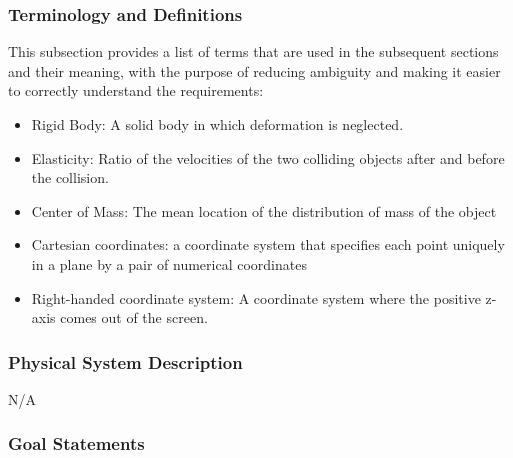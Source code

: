 \documentclass[12pt]{article}
\begin{document}
\subsubsection{Terminology and  Definitions}

This subsection provides a list of terms that are used in the subsequent
sections and their meaning, with the purpose of reducing ambiguity and making it
easier to correctly understand the requirements:

\begin{itemize}

\item Rigid Body: A solid body in which deformation is neglected.
\item Elasticity: Ratio of the velocities of the two colliding objects after and
before the collision.
\item Center of Mass: The mean location of the distribution of mass of the object
\item  Cartesian coordinates: a coordinate system that specifies each point uniquely in
 a plane by a pair of numerical coordinates
\item  Right-handed coordinate system: A coordinate system where the positive z-axis comes out of the screen.

\end{itemize}

\subsubsection{Physical System Description}

N/A

\subsubsection{Goal Statements}
\end{document}
